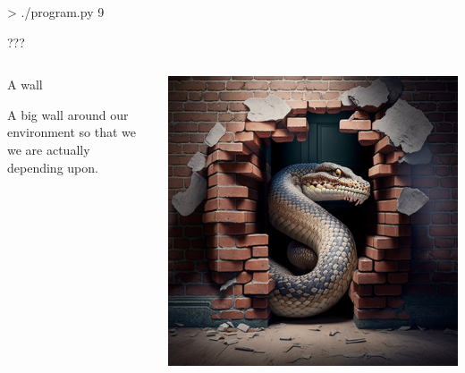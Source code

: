 \documentclass{slide}
\begin{document}
\begin{frame}[fragile]
    \begin{code}[numbers=none]{}
> ./program.py
9
    \end{code}
    \pause
    ???
\end{frame}


\begin{frame}
    \vspace{-2em}
    \begin{columns}
    \begin{column}{0.4\textwidth}
    {\color{primary}\large A wall}
    \vspace{1em}

    A big wall around our environment so that we
     we are actually depending upon.
    \end{column}
    \begin{column}{0.6\textwidth}
    \begin{center}
    \includegraphics[height=0.95\textheight]{images/python-wall}
    \end{center}
    \end{column}
    \end{columns}
\end{frame}
\end{document}
